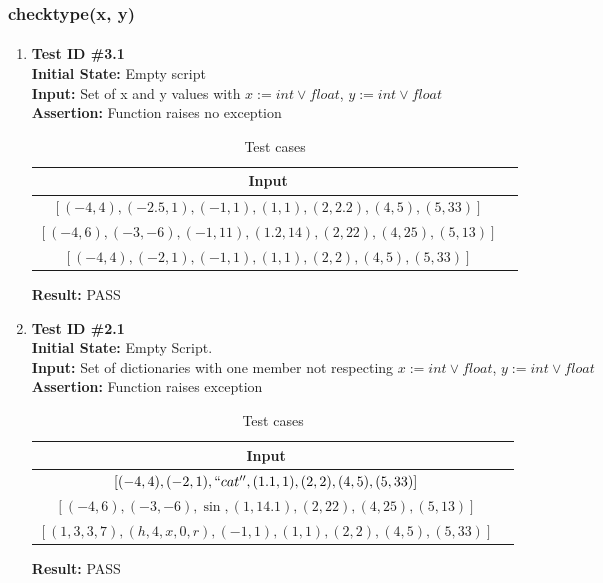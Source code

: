 \documentclass[12pt, titlepage]{article}
\begin{document}
\subsubsection{checktype(x, y)}		
	\label{sec:4.0.3}
	\paragraph{}
		\begin{enumerate}
			\item{\textbf{Test ID \#3.1\\}}
			\textbf{Initial State:} Empty script\\
			\textbf{Input:} Set of x and y values with $x:= int \vee float$, $y:= int \vee float$ \\
						\textbf{Assertion:} Function raises no exception \\
			\begin{table}[h!]
			  \centering
			  \caption{Test cases}
			  \begin{tabular}{|c|c|}
			  	\toprule
			   	 Input\\
			   	 \midrule
			   	 $[ (-4,4), (-2.5,1), (-1,1) , (1,1), (2,2.2), (4,5), (5,33)] $ \\
			   	 $[ (-4,6), (-3,-6), (-1,11) , (1.2,14), (2,22), (4,25), (5,13) ]$\\
			   	 $[ (-4,4), (-2,1), (-1,1) , (1,1), (2,2), (4,5), (5,33) ]$\\

			   	 \bottomrule
			  \end{tabular}
			\end{table}

			\textbf{Result:} PASS
			
			\item{\textbf{Test ID \#2.1\\}}
			\textbf{Initial State:} Empty Script.\\
			\textbf{Input:} Set of dictionaries with one member not respecting $x:= int \vee float$, $y:= int \vee float$ \\
			\textbf{Assertion:} Function raises exception \\
			
			\begin{table}[h!]
			  \centering
			  \caption{Test cases}
			  \begin{tabular}{|c|c|}
			  	\toprule
			   	 Input\\
			   	 \midrule
			   	 $[ (-4,4), (-2,1), ``cat'' , (1.1,1), (2,2), (4,5), (5,33)] $ \\
			   	 $[ (-4,6), (-3,-6), \sin , (1,14.1), (2,22), (4,25), (5,13) ]$\\
			   	 $[ (1,3,3,7), (h,4,x,0,r), (-1,1) , (1,1), (2,2), (4,5), (5,33) ]$\\

			   	 \bottomrule
			  \end{tabular}
			\end{table}
			
			\textbf{Result:} PASS
		\end{enumerate}
		
\end{document}

